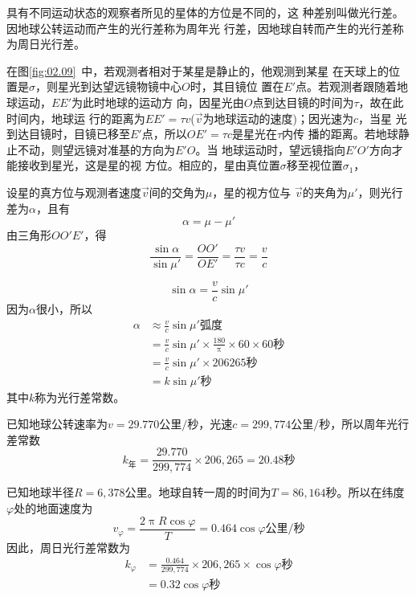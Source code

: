   具有不同运动状态的观察者所见的星体的方位是不同的，这
  种差别叫做光行差。因地球公转运动而产生的光行差称为周年光
  行差，因地球自转而产生的光行差称为周日光行差。

  在图\ref{fig:02.09}~中，若观测者相对于某星是静止的，他观测到某星
  在天球上的位置是$\sigma$，则星光到达望远镜物镜中心$O$时，其目镜位
  置在$E'$点。若观测者跟随着地球运动，$EE'$为此时地球的运动方
  向，因星光由$O$点到达目镜的时间为$\tau$，故在此时间内，地球运
  行的距离为$EE'=\tau v$($\vec{v}$为地球运动的速度)；因光速为$c$，当星
  光到达目镜时，目镜已移至$E'$点，所以$OE'=\tau c$是星光在$\tau$内传
  播的距离。若地球静止不动，则望远镜对准基的方向为$E'O$。当
  地球运动时，望远镜指向$E'O'$方向才能接收到星光，这是星的视
  方位。相应的，星由真位置$\sigma$移至视位置$\sigma_1$，

  设星的真方位与观测者速度$\vec{v}$间的交角为$\mu$，星的视方位与
$\vec{v}$的夹角为$\mu'$，则光行差为$\alpha$，且有
  \begin{equation*}
    \alpha=\mu-\mu'
  \end{equation*}
  由三角形$OO'E'$，得
  \begin{equation*}
    \frac{\sin\alpha}{\sin\mu'}=\frac{OO'}{OE'}=\frac{\tau v}{\tau c}=\frac{v}{c}
  \end{equation*}

  \begin{equation*}
    \sin\alpha=\frac{v}{c}\sin\mu'
  \end{equation*}
  因为$\alpha$很小，所以
  \begin{align*}
    \alpha & \approx\frac{v}{c}\sin\mu'\text{弧度}                                    \\
           & =\frac{v}{c}\sin\mu'\times\frac{180}{\uppi}\times 60 \times 60 \text{秒} \\
           & =\frac{v}{c}\sin\mu'\times 206265\text{秒}                               \\
           & =k\sin\mu'\text{秒}
  \end{align*}
  其中$k$称为光行差常数。

  已知地球公转速率为$v=29.770\text{公里/秒}$，光速$c=299,774
\text{公里/秒}$，所以周年光行差常数
  \begin{equation*}
    k_\text{年}=\frac{29.770}{299,774}\times 206,265=20.48\text{秒}
  \end{equation*}

  已知地球半径$R=6,378\text{公里}$。地球自转一周的时间为$T=
86,164\text{秒}$。所以在纬度$\varphi$处的地面速度为
\begin{equation*}
  v_\varphi=\frac{2\uppi R\cos\varphi}{T}=0.464\cos\varphi\text{公里/秒}
\end{equation*}
因此，周日光行差常数为
\begin{align*}
  k_\varphi & =\frac{0.464}{299,774}\times 206,265\times\cos\varphi\text{秒} \\
            & =0.32\cos\varphi\text{秒}
\end{align*}